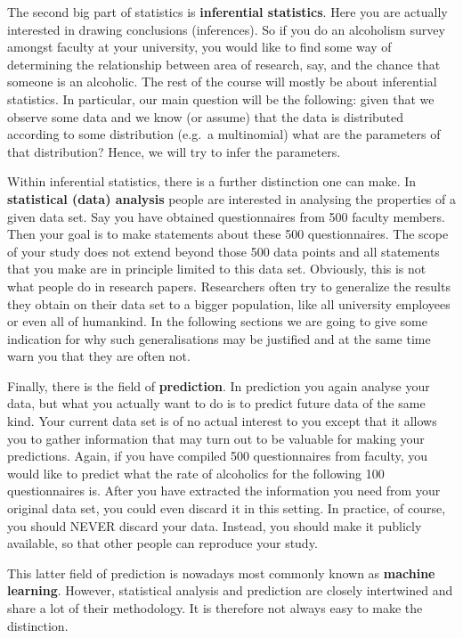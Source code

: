 The second big part of statistics is \textbf{inferential statistics}. Here you are actually interested in drawing
conclusions (inferences). So if you do an alcoholism survey amongst faculty at your university, you would like to find some
way of determining the relationship between area of research, say, and the chance that someone is an alcoholic. The rest of the
course will mostly be about inferential statistics. In particular, our main question will be the following: given that we observe some data and
we know (or assume) that the data is distributed according to some distribution (e.g.\ a multinomial) what are the parameters of that distribution? Hence, we will try to infer the parameters.

Within inferential statistics, there is a further distinction one can make. In \textbf{statistical (data) analysis} people are interested in analysing
the properties of a given data set. Say you have obtained questionnaires from 500 faculty members. Then your goal is to make
statements about these 500 questionnaires. The scope of your study does not extend beyond those 500 data points and all statements that you make
are in principle limited to this data set. Obviously, this is not what people do in research papers. Researchers
often try to generalize the results they obtain on their data set to a bigger population, like all university employees or even
all of humankind. In the following sections we are going to give some indication for why such generalisations may be justified and
at the same time warn you that they are often not.

Finally, there is the field of \textbf{prediction}. In prediction you again analyse your data, but what you actually want to
do is to predict future data of the same kind. Your current data set is of no actual interest to you except that it allows you
to gather information that may turn out to be valuable for making your predictions. Again, if you have compiled 500 questionnaires from 
faculty, you would like to predict what the rate of alcoholics for the following 100 questionnaires is. After you have extracted
the information you need from your original data set, you could even discard it in this setting. In practice, of course, you 
should NEVER discard your data. Instead, you should make it publicly available, so that other people can reproduce your study.

This latter field of prediction is nowadays most commonly known as \textbf{machine learning}. However, statistical analysis and 
prediction are closely intertwined and share a lot of their methodology. It is therefore not always easy to make the distinction.


